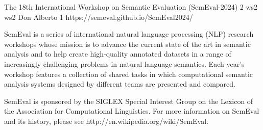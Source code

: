 \begin{wsschedulenolist}
{The 18th International Workshop on Semantic Evaluation (SemEval-2024)}
{2}
{ws2}
{ws2}
{Don Alberto 1}
{https://semeval.github.io/SemEval2024/}

SemEval is a series of international natural language processing (NLP) research workshops whose mission is to advance the current state of the art in semantic analysis and to help create high-quality annotated datasets in a range of increasingly challenging problems in natural language semantics. Each year's workshop features a collection of shared tasks in which computational semantic analysis systems designed by different teams are presented and compared.

SemEval is sponsored by the SIGLEX Special Interest Group on the Lexicon of the Association for Computational Linguistics. For more information on SemEval and its history, please see http://en.wikipedia.org/wiki/SemEval.

\end{wsschedulenolist}
